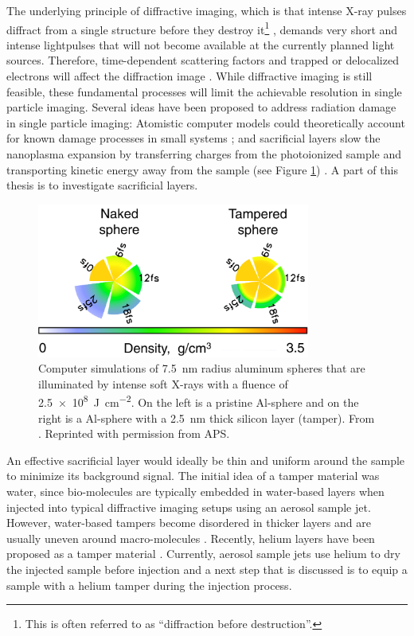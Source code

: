 The underlying principle of diffractive imaging, which is that intense X-ray pulses diffract from a single structure before they destroy it\footnote{This is often referred to as ``diffraction before destruction''.} \cite{Neutze-2000-Nature}, demands very short and intense lightpulses \cite{Huldt-2003-JSB,Hau-Riege-2005-PRE} that will not become available at the currently planned light sources. Therefore, time-dependent scattering factors and trapped or delocalized electrons will affect the diffraction image \cite{Aquila-2015-StrucDyn}. While diffractive imaging is still feasible, these fundamental processes will limit the achievable resolution in single particle imaging. Several ideas have been proposed to address radiation damage in single particle imaging: Atomistic computer models could theoretically account for known damage processes in small systems \citep{Ho-2016-PRA,Quiney-2010-NatPhys,Yoon-2016-scirep}; and sacrificial layers slow the nanoplasma expansion by transferring charges from the photoionized sample and transporting kinetic energy away from the sample (see Figure \ref{fig:tamper-layer}) \citep{Hau-Riege-2004-PRE,Hau-Riege-2010-PRL,Hoener-2008-JPB}. A part of this thesis is to investigate sacrificial layers.\\[1\baselineskip]
%
\begin{figure}
	\centering
		\includegraphics[width=0.80\textwidth]{images/tamper-layer.png}
	\caption[Computer simulations of aluminum spheres with tamper layers]{Computer simulations of \SI{7.5}{\nano\meter} radius aluminum spheres that are illuminated by intense soft X-rays with a fluence of \SI{2.5e8}{\joule\per\square\centi\meter}. On the left is a pristine Al-sphere and on the right is a Al-sphere with a \SI{2.5}{\nano\meter} thick silicon layer (tamper). From \citep{Hau-Riege-2010-PRL}. Reprinted with permission from APS.}
	\label{fig:tamper-layer}
\end{figure}
%
An effective sacrificial layer would ideally be thin and uniform around the sample to minimize its background signal. The initial idea of a tamper material was water, since bio-molecules are typically embedded in water-based layers when injected into typical diffractive imaging setups using an aerosol sample jet. However, water-based tampers become disordered in thicker layers and are usually uneven around macro-molecules \cite{Aquila-2015-StrucDyn}. Recently, helium layers have been proposed as a tamper material \cite{Mikaberidze-2008-PRA}. Currently, aerosol sample jets use helium to dry the injected sample before injection and a next step that is discussed \cite{Bielecki-2016-PC} is to equip a sample with a helium tamper during the injection process.\\[1\baselineskip]
